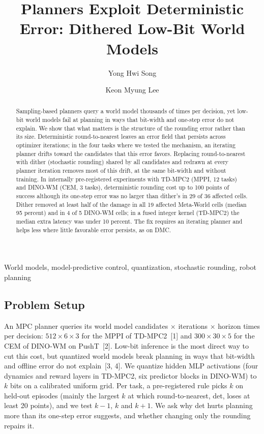 \documentclass[nouppercase]{kaia}
\title{Planners Exploit Deterministic Error: Dithered Low-Bit World Models}
\author{Yong Hwi Song}{a}
\author{Keon Myung Lee}{b}
\affiliation{School of Information and Communication Engineering, Chungbuk National University, Korea, thddydgnl1937@gmail.com}{a}
\affiliation{School of Software, Chungbuk National University, Korea, kmlee@cbnu.ac.kr}{b}
\newcommand{\dtm}{\textsf{det}}
\begin{document}
\maketitle
\vspace{-28pt}

\begin{mdframed}

\begin{abstract}
Sampling-based planners query a world model thousands of times per decision, yet low-bit world models fail at planning in ways that bit-width and one-step error do not explain. We show that what matters is the structure of the rounding error rather than its size. Deterministic round-to-nearest leaves an error field that persists across optimizer iterations; in the four tasks where we tested the mechanism, an iterating planner drifts toward the candidates that this error favors. Replacing round-to-nearest with dither (stochastic rounding) shared by all candidates and redrawn at every planner iteration removes most of this drift, at the same bit-width and without training. In internally pre-registered experiments with TD-MPC2 (MPPI, 12 tasks) and DINO-WM (CEM, 3 tasks), deterministic rounding cost up to 100 points of success although its one-step error was no larger than dither's in 29 of 36 affected cells. Dither removed at least half of the damage in all 19 affected Meta-World cells (median 95 percent) and in 4 of 5 \mbox{DINO-WM} cells; in a fused integer kernel (TD-MPC2) the median extra latency was under 10 percent. The fix requires an iterating planner and helps less where little favorable error persists, as on DMC.
\end{abstract}
\begin{keywords}
World models, model-predictive control, quantization, stochastic rounding, robot planning
\end{keywords}

\subsection{Problem Setup}
An MPC planner queries its world model candidates $\times$ iterations $\times$ horizon times per decision: $512\times6\times3$ for the MPPI of TD-MPC2~[1] and $300\times30\times5$ for the CEM of DINO-WM on PushT~[2]. Low-bit inference is the most direct way to cut this cost, but quantized world models break planning in ways that bit-width and offline error do not explain~[3, 4]. We quantize hidden MLP activations (four dynamics and reward layers in TD-MPC2, six predictor blocks in \mbox{DINO-WM}) to $k$ bits on a calibrated uniform grid. Per task, a pre-registered rule picks $k$ on held-out episodes (mainly the largest $k$ at which round-to-nearest, \dtm, loses at least 20 points), and we test $k-1$, $k$ and $k+1$. We ask why \dtm{} hurts planning more than its one-step error suggests, and whether changing only the rounding repairs it.


\end{mdframed}
\end{document}
